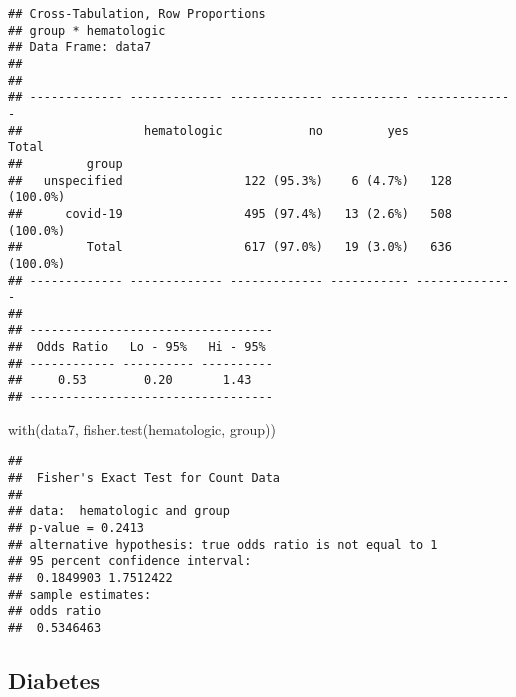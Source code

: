 \documentclass[
]{article}
\newenvironment{Shaded}{\begin{snugshade}}{\end{snugshade}}
\newcommand{\AttributeTok}[1]{\textcolor[rgb]{0.77,0.63,0.00}{#1}}
\newcommand{\ConstantTok}[1]{\textcolor[rgb]{0.00,0.00,0.00}{#1}}
\newcommand{\FunctionTok}[1]{\textcolor[rgb]{0.00,0.00,0.00}{#1}}
\newcommand{\NormalTok}[1]{#1}
\newcommand{\SpecialCharTok}[1]{\textcolor[rgb]{0.00,0.00,0.00}{#1}}
\newcommand{\StringTok}[1]{\textcolor[rgb]{0.31,0.60,0.02}{#1}}
\begin{document}
\begin{verbatim}
## Cross-Tabulation, Row Proportions  
## group * hematologic  
## Data Frame: data7  
## 
## 
## ------------- ------------- ------------- ----------- --------------
##                 hematologic            no         yes          Total
##         group                                                       
##   unspecified                 122 (95.3%)    6 (4.7%)   128 (100.0%)
##      covid-19                 495 (97.4%)   13 (2.6%)   508 (100.0%)
##         Total                 617 (97.0%)   19 (3.0%)   636 (100.0%)
## ------------- ------------- ------------- ----------- --------------
## 
## ----------------------------------
##  Odds Ratio   Lo - 95%   Hi - 95% 
## ------------ ---------- ----------
##     0.53        0.20       1.43   
## ----------------------------------
\end{verbatim}

\begin{Shaded}
\begin{Highlighting}[]
\FunctionTok{with}\NormalTok{(data7, }\FunctionTok{fisher.test}\NormalTok{(hematologic, group))}
\end{Highlighting}
\end{Shaded}

\begin{verbatim}
## 
##  Fisher's Exact Test for Count Data
## 
## data:  hematologic and group
## p-value = 0.2413
## alternative hypothesis: true odds ratio is not equal to 1
## 95 percent confidence interval:
##  0.1849903 1.7512422
## sample estimates:
## odds ratio 
##  0.5346463
\end{verbatim}

\hypertarget{diabetes}{%
\subsection{Diabetes}\label{diabetes}}

\begin{Shaded}
\end{Shaded}
\end{document}
